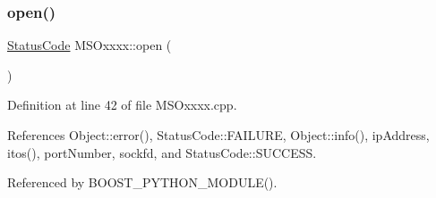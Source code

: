 \subsubsection{\texorpdfstring{open()}{open()}}
{\footnotesize\ttfamily \hyperlink{classStatusCode}{Status\+Code} M\+S\+Oxxxx\+::open (\begin{DoxyParamCaption}{ }\end{DoxyParamCaption})}



Definition at line 42 of file M\+S\+Oxxxx.\+cpp.



References Object\+::error(), Status\+Code\+::\+F\+A\+I\+L\+U\+RE, Object\+::info(), ip\+Address, itos(), port\+Number, sockfd, and Status\+Code\+::\+S\+U\+C\+C\+E\+SS.



Referenced by B\+O\+O\+S\+T\+\_\+\+P\+Y\+T\+H\+O\+N\+\_\+\+M\+O\+D\+U\+L\+E().


